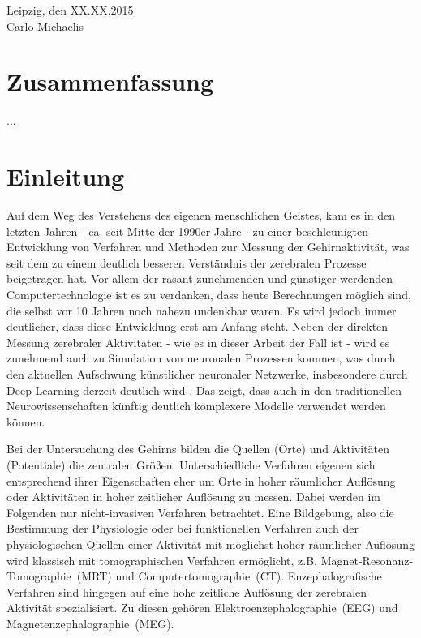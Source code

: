 \documentclass[doc,a4paper,12pt]{apa6}
\begin{document}
\vspace{3em}
\noindent Leipzig, den XX.XX.2015\\ Carlo Michaelis

\newpage

\section*{Zusammenfassung}

...

\newpage

\setcounter{tocdepth}{2}
\tableofcontents
\newpage

\listoffigures
\newpage

\section{Einleitung}

Auf dem Weg des Verstehens des eigenen menschlichen Geistes, kam es in den letzten Jahren - ca. seit Mitte der 1990er Jahre - zu einer beschleunigten Entwicklung von Verfahren und Methoden zur Messung der Gehirnaktivität, was seit dem zu einem deutlich besseren Verständnis der zerebralen Prozesse beigetragen hat. Vor allem der rasant zunehmenden und günstiger werdenden Computertechnologie ist es zu verdanken, dass heute Berechnungen möglich sind, die selbst vor 10 Jahren noch nahezu undenkbar waren. Es wird jedoch immer deutlicher, dass diese Entwicklung erst am Anfang steht. Neben der direkten Messung zerebraler Aktivitäten - wie es in dieser Arbeit der Fall ist - wird es zunehmend auch zu Simulation von neuronalen Prozessen kommen, was durch den aktuellen Aufschwung künstlicher neuronaler Netzwerke, insbesondere durch Deep Learning derzeit deutlich wird \parencite[z.B.][]{ciresan2012multi}. Das zeigt, dass auch in den traditionellen Neurowissenschaften künftig deutlich komplexere Modelle verwendet werden können.

Bei der Untersuchung des Gehirns bilden die Quellen (Orte) und Aktivitäten (Potentiale) die zentralen Größen. Unterschiedliche Verfahren eigenen sich entsprechend ihrer Eigenschaften eher um Orte in hoher räumlicher Auflösung oder Aktivitäten in hoher zeitlicher Auflösung zu messen. Dabei werden im Folgenden nur nicht-invasiven Verfahren betrachtet. Eine Bildgebung, also die Bestimmung der Physiologie oder bei funktionellen Verfahren auch der physiologischen Quellen einer Aktivität mit möglichst hoher räumlicher Auflösung wird klassisch mit tomographischen Verfahren ermöglicht, z.B. Magnet-Resonanz-Tomographie~(MRT) und Computertomographie~(CT). Enzephalografische Verfahren sind hingegen auf eine hohe zeitliche Auflösung der zerebralen Aktivität spezialisiert. Zu diesen gehören Elektroenzephalographie~(EEG) und Magnetenzephalographie~(MEG).
\end{document}
